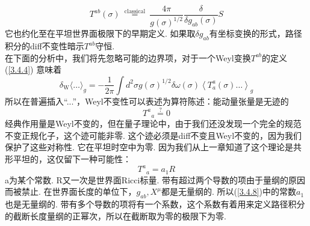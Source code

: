 \begin{equation}
T^{a b}(\sigma) \stackrel{\text { classical }}{=} \frac{4 \pi}{g(\sigma)^{1 / 2}} \frac{\delta}{\delta g_{a b}(\sigma)} S
\end{equation}
它也约化至在平坦世界面极限下的早期定义. 如果取$\delta g_{a b}$有坐标变换的形式，路径积分的diff不变性暗示$T^{ab}$守恒.\\
在下面的分析中，我们将先忽略可能的边界项，对于一个Weyl变换$T^{ab}$的定义(\ref{3.4.4}) 意味着
\begin{equation}\label{3.4.6}
\delta_{\mathrm{W}}\langle\ldots\rangle_{g}=-\frac{1}{2 \pi} \int d^{2} \sigma g(\sigma)^{1 / 2} \delta \omega(\sigma)\left\langle T_{a}^{a}(\sigma) \ldots\right\rangle_{g}
\end{equation}
所以在普遍插入“...”，Weyl不变性可以表述为算符陈述：能动量张量是无迹的
\begin{equation}
{T^a}_{a} \stackrel{?}{=} 0
\end{equation}
经典作用量是Weyl不变的，但在量子理论中，由于我们还没发现一个完全的规范不变正规化子，这个迹可能非零. 这个迹必须是diff不变且Weyl不变的，因为我们保护了这些对称性. 它在平坦时空中为零. 因为我们从上一章知道了这个理论是共形平坦的，这仅留下一种可能性：
\begin{equation}\label{3.4.8}
{T^a}_{a}=a_{1} R
\end{equation}
a为某个常数. R又一次是世界面Ricci标量. 带有超过两个导数的项由于量纲的原因而被禁止. 在世界面长度的单位下，$g_{ab}, X^\mu$都是无量纲的. 所以(\ref{3.4.8})中的常数$a_1$也是无量纲的. 带有多个导数的项将有一个系数，这个系数有着用来定义路径积分的截断长度量纲的正幂次，所以在截断取为零的极限下为零.\\

